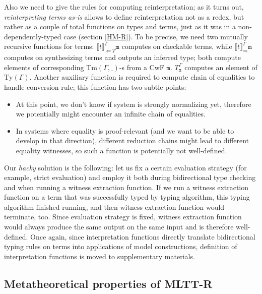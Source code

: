 Also we need to give the rules for computing
reinterpretation; as it turns out,
\textit{reinterpreting terms as-is} allows to define
reinterpretation not as a redex, but rather as a couple
of total functions on types and terms, just as it was in
a non-dependently-typed case (section \ref{HM-R}). To be
precise, we need two mutually recursive functions for
terms: $\llbracket t\rrbracket^\Gamma_{\Leftarrow T}
\mathtt{m}$ computes on checkable terms, while
$\llbracket t\rrbracket^\Gamma_{\Rightarrow}\mathtt{m}$
computes on synthesizing terms and outputs an inferred
type; both compute elements of corresponding
$\mathrm{Tm}(\Gamma,\_)$-s from a CwF $\mathtt{m}$.
$T^\Gamma_\mathtt{m}$ computes an element of
$\mathrm{Ty}(\Gamma)$. Another auxiliary function is
required to compute chain of equalities to handle
conversion rule; this function has two subtle points:

\begin{itemize}
    \item At this point, we don't know if system is
        strongly normalizing yet, therefore we
        potentially might encounter an infinite chain of
        equalities.
    \item In systems where equality is proof-relevant
        (and we want to be able to develop in that
        direction), different reduction chains might
        lead to different equality witnesses, so such a
        function is potentially not well-defined.
\end{itemize}

Our \textit{hacky} solution is the following: let us
fix a certain evaluation strategy (for example, strict
evaluation) and employ it both during bidirectional
type checking and when running a witness extraction
function. If we run a witness extraction function on a
term that was successfully typed by typing algorithm,
this typing algorithm finished running, and then
witness extraction function would terminate, too. Since
evaluation strategy is fixed, witness extraction
function would always produce the same output on the
same input and is therefore well-defined. Once again,
since interpretation functions directly translate
bidirectional typing rules on terms into applications
of model constructions, definition of interpretation
functions is moved to supplementary materials.

\subsection{Metatheoretical properties of MLTT-R}
\label{MLTT-R-properties}

